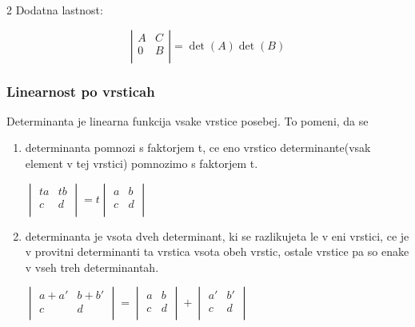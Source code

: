 \documentclass{article}
\begin{document}
\begin{multicols}{2}
	Dodatna lastnost:

	\[
		\left| \begin{array}{cc}
			A & C \\
			0 & B \\
		\end{array} \right| = \det(A) \det(B)
	\]

	\subsubsection{Linearnost po vrsticah}

	Determinanta je linearna funkcija vsake vrstice posebej. To pomeni, da se
	\begin{enumerate}
		\item determinanta pomnozi s faktorjem t, ce eno vrstico determinante(vsak element v tej vrstici)
		      pomnozimo s faktorjem t.
		      \begin{center}
			      \begin{math}
				      \begin{vmatrix}
					      ta & tb \\
					      c  & d  \\
				      \end{vmatrix}
				      = t
				      \begin{vmatrix}
					      a & b \\
					      c & d \\
				      \end{vmatrix}
			      \end{math}
		      \end{center}
		\item determinanta je vsota dveh determinant, ki se razlikujeta le v eni vrstici,
		      ce je v provitni determinanti ta vrstica vsota obeh vrstic, ostale vrstice pa so enake
		      v vseh treh determinantah.
		      \begin{center}
			      \begin{math}
				      \begin{vmatrix}
					      a + a' & b + b' \\
					      c      & d      \\
				      \end{vmatrix} =
				      \begin{vmatrix}
					      a & b \\
					      c & d \\
				      \end{vmatrix} +
				      \begin{vmatrix}
					      a' & b' \\
					      c  & d  \\
				      \end{vmatrix}
			      \end{math}
		      \end{center}
	\end{enumerate}


\end{multicols}
\end{document}
